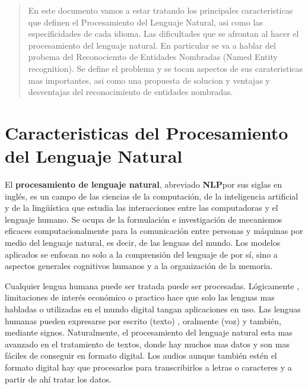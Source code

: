 \documentclass{llncs}
\begin{document}
	
	\maketitle              %
	
	\begin{abstract}
		En este documento vamos a estar tratando los principales caracteristicas que definen el Procesamiento del Lenguaje Natural, asi como las especificidades de cada idioma. Las dificultades que se afrontan al hacer el procesamiento del lenguaje natural. En particular se va a hablar del probema del Reconociemto de Entidades Nombradas (Named Entity recognition). Se define el problema y se tocan aspectos de sus carateristicas mas importantes, asi como una propuesta de solucion y ventajas y desventajas del reconocimiento de entidades nombradas.   
		
		
	\end{abstract}
	
	\section{Caracteristicas del Procesamiento del Lenguaje Natural}
	
	El \textbf{procesamiento de lenguaje natural}, abreviado \textbf{NLP}por sus siglas en inglés, es un campo de las ciencias de la computación, de la inteligencia artificial y de la lingüística que estudia las interacciones entre las computadoras y el lenguaje humano. Se ocupa de la formulación e investigación de mecanismos eficaces computacionalmente para la comunicación entre personas y máquinas por medio del lenguaje natural, es decir, de las lenguas del mundo.  Los modelos aplicados se enfocan no solo a la comprensión del lenguaje de por sí, sino a aspectos generales cognitivos humanos y a la organización de la memoria.
	
	Cualquier lengua humana puede ser tratada puede ser procesadas. Lógicamente , limitaciones de interés económico o practico hace que solo las lenguas mas habladas o utilizadas en el mundo digital tangan aplicaciones en uso. Las lenguas humanas pueden expresarse por escrito (texto) , oralmente (voz) y también, mediante signos. Naturalmente, el procesamiento del lenguaje natural esta mas avanzado en el tratamiento de  textos, donde hay muchos mas datos y son mas fáciles de conseguir en formato digital. Los audios aunque también estén el formato digital hay que procesarlos para transcribirlos a letras o caracteres y a partir de ahí tratar los datos.  
	
\end{document}
